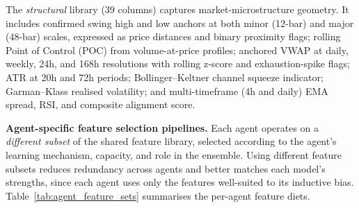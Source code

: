 The \textit{structural} library (39 columns) captures market-microstructure geometry. It includes confirmed swing high and low anchors at both minor (12-bar) and major (48-bar) scales, expressed as price distances and binary proximity flags; rolling Point of Control (POC) from volume-at-price profiles; anchored VWAP at daily, weekly, 24h, and 168h resolutions with rolling z-score and exhaustion-spike flags; ATR at 20h and 72h periods; Bollinger--Keltner channel squeeze indicator; Garman--Klass realised volatility; and multi-timeframe (4h and daily) EMA spread, RSI, and composite alignment score.


\textbf{Agent-specific feature selection pipelines.}
Each agent operates on a \textit{different subset} of the shared feature library, selected according to the agent's learning mechanism, capacity, and role in the ensemble. Using different feature subsets reduces redundancy across agents and better matches each model's strengths, since each agent uses only the features well-suited to its inductive bias. Table~\ref{tab:agent_feature_sets} summarises the per-agent feature diets.

